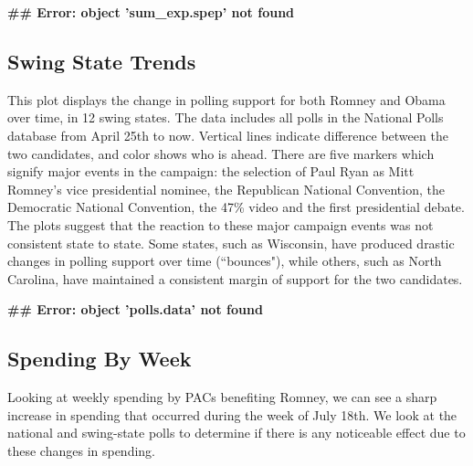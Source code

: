 \documentclass[11pt]{article}\usepackage{graphicx, color}
\makeatletter
\newenvironment{kframe}{%
 \def\at@end@of@kframe{}%
 \ifinner\ifhmode%
  \def\at@end@of@kframe{\end{minipage}}%
  \begin{minipage}{\columnwidth}%
 \fi\fi%
 \def\FrameCommand##1{\hskip\@totalleftmargin \hskip-\fboxsep
 \colorbox{shadecolor}{##1}\hskip-\fboxsep
     \hskip-\linewidth \hskip-\@totalleftmargin \hskip\columnwidth}%
 \MakeFramed {\advance\hsize-\width
   \@totalleftmargin\z@ \linewidth\hsize
   \@setminipage}}%
 {\par\unskip\endMakeFramed%
 \at@end@of@kframe}
\newenvironment{knitrout}{}{} %
\makeatother
\begin{document}
\begin{knitrout}
\color{fgcolor}\begin{kframe}


{\ttfamily\noindent\bfseries\textcolor{errorcolor}{\#\# Error: object 'sum\_exp.spep' not found}}\end{kframe}
\end{knitrout}




\subsection{Swing State Trends}

This plot displays the change in polling support for both Romney and Obama over time, in 12 swing states. The data includes all polls in the National Polls database from April 25th to now. Vertical lines indicate difference between the two candidates, and color shows who is ahead. There are five markers which signify major events in the campaign: the selection of Paul Ryan as Mitt Romney's vice presidential nominee, the Republican National Convention, the Democratic National Convention, the 47\% video and the first presidential debate. 
The plots suggest that the reaction to these major campaign events was not consistent state to state. Some states, such as Wisconsin, have produced drastic changes in polling support over time (``bounces"), while others, such as North Carolina, have maintained a consistent margin of support for the two candidates.

\begin{knitrout}
\color{fgcolor}\begin{kframe}


{\ttfamily\noindent\bfseries\textcolor{errorcolor}{\#\# Error: object 'polls.data' not found}}\end{kframe}
\end{knitrout}



\subsection{Spending By Week}

Looking at weekly spending by PACs benefiting Romney, we can see a sharp increase in spending that occurred during the week of July 18th. We look at the national and swing-state polls to determine if there is any noticeable effect due to these changes in spending.
\end{document}
